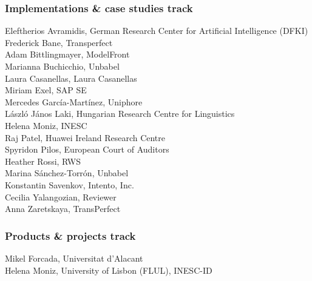 \documentclass[a4paper,11pt,twoside]{book}
\begin{document}
\vfill

\pagebreak

\subsubsection*{Implementations \& case studies track}
\noindent Eleftherios Avramidis, German Research Center for Artificial Intelligence (DFKI)\\
\noindent Frederick Bane, Transperfect\\
\noindent Adam Bittlingmayer, ModelFront\\
\noindent Marianna Buchicchio, Unbabel\\
\noindent Laura Casanellas, Laura Casanellas\\
\noindent Miriam Exel, SAP SE\\
\noindent Mercedes García-Martínez, Uniphore\\
\noindent László János Laki, Hungarian Research Centre for Linguistics\\
\noindent Helena Moniz, INESC\\
\noindent Raj Patel, Huawei Ireland Research Centre\\
\noindent Spyridon Pilos, European Court of Auditors\\
\noindent Heather Rossi, RWS\\
\noindent Marina Sánchez-Torrón, Unbabel\\
\noindent Konstantin Savenkov, Intento, Inc.\\
\noindent Cecilia Yalangozian, Reviewer\\
\noindent Anna Zaretskaya, TransPerfect

\vfill

\pagebreak

\subsubsection*{Products \& projects track}
\noindent Mikel Forcada, Universitat d’Alacant\\
\noindent Helena Moniz, University of Lisbon (FLUL), INESC-ID

\clearpage
\end{document}
